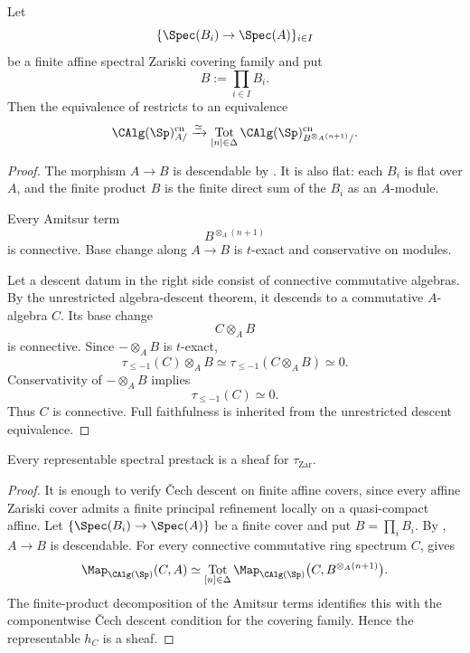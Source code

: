 \begin{corollary}
\label{cor:connective-zariski-algebra-descent}
Let
\[
    \{\Spec(B_i)\to\Spec(A)\}_{i\in I}
\]
be a finite affine spectral Zariski covering family and put
\[
    B
    :=
    \prod_{i\in I}B_i.
\]
Then the equivalence of
 restricts to an equivalence
\[
    \CAlg(\Sp)^{\mathrm{cn}}_{A/}
    \xrightarrow{\simeq}
    \operatorname*{Tot}_{[n]\in\Delta}
    \CAlg(\Sp)^{\mathrm{cn}}_
    {B^{\otimes_A(n+1)}/}.
\]
\end{corollary}

\begin{proof}
The morphism $A\to B$ is descendable by
. It is also flat: each
$B_i$ is flat over $A$, and the finite product $B$ is the finite direct
sum of the $B_i$ as an $A$-module.

Every Amitsur term
\[
    B^{\otimes_A(n+1)}
\]
is connective. Base change along $A\to B$ is $t$-exact and conservative
on modules.

Let a descent datum in the right side consist of connective commutative
algebras. By the unrestricted algebra-descent theorem, it descends to a
commutative $A$-algebra $C$. Its base change
\[
    C\otimes_AB
\]
is connective. Since $-\otimes_AB$ is $t$-exact,
\[
    \tau_{\leq -1}(C)\otimes_AB
    \simeq
    \tau_{\leq -1}(C\otimes_AB)
    \simeq
    0.
\]
Conservativity of $-\otimes_AB$ implies
\[
    \tau_{\leq -1}(C)
    \simeq
    0.
\]
Thus $C$ is connective. Full faithfulness is inherited from the
unrestricted descent equivalence.
\end{proof}

\begin{theorem}
\label{thm:spectral-zariski-subcanonical}
Every representable spectral prestack is a sheaf for
$\tau_{\mathrm{Zar}}$.
\end{theorem}

\begin{proof}
It is enough to verify \v{C}ech descent on finite affine covers, since every
affine Zariski cover admits a finite principal refinement locally on a
quasi-compact affine. Let $\{\Spec(B_i)\to\Spec(A)\}$ be a finite cover and
put $B=\prod_iB_i$. By
, $A\to B$ is descendable.
For every connective commutative ring spectrum $C$,
 gives
\[
    \Map_{\CAlg(\Sp)}(C,A)
    \simeq
    \operatorname*{Tot}_{[n]\in\Delta}
    \Map_{\CAlg(\Sp)}
    \bigl(
        C,
        B^{\otimes_A(n+1)}
    \bigr).
\]
The finite-product decomposition of the Amitsur terms identifies this
with the componentwise \v{C}ech descent condition for the covering family.
Hence the representable $h_C$ is a sheaf.
\end{proof}

